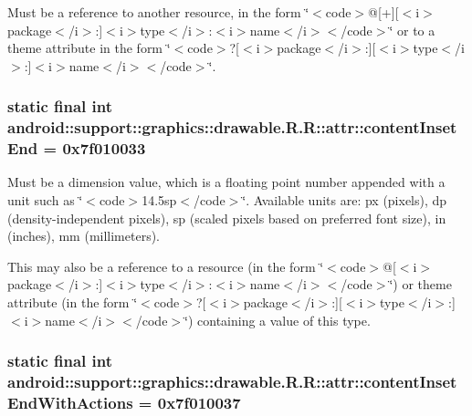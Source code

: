 Must be a reference to another resource, in the form \char`\"{}$<$code$>$@\mbox{[}+\mbox{]}\mbox{[}$<$i$>$package$<$/i$>$:\mbox{]}$<$i$>$type$<$/i$>$:$<$i$>$name$<$/i$>$$<$/code$>$\char`\"{} or to a theme attribute in the form \char`\"{}$<$code$>$?\mbox{[}$<$i$>$package$<$/i$>$:\mbox{]}\mbox{[}$<$i$>$type$<$/i$>$:\mbox{]}$<$i$>$name$<$/i$>$$<$/code$>$\char`\"{}. \hypertarget{classandroid_1_1support_1_1graphics_1_1drawable_1_1_r_1_1attr_b7284e45241ce881c7ae97c4d7c5f2c3}{
\subsubsection[{contentInsetEnd}]{\setlength{\rightskip}{0pt plus 5cm}static final int android::support::graphics::drawable.R.R::attr::contentInsetEnd = 0x7f010033}}
\label{classandroid_1_1support_1_1graphics_1_1drawable_1_1_r_1_1attr_b7284e45241ce881c7ae97c4d7c5f2c3}


Must be a dimension value, which is a floating point number appended with a unit such as \char`\"{}$<$code$>$14.5sp$<$/code$>$\char`\"{}. Available units are: px (pixels), dp (density-independent pixels), sp (scaled pixels based on preferred font size), in (inches), mm (millimeters). 

This may also be a reference to a resource (in the form \char`\"{}$<$code$>$@\mbox{[}$<$i$>$package$<$/i$>$:\mbox{]}$<$i$>$type$<$/i$>$:$<$i$>$name$<$/i$>$$<$/code$>$\char`\"{}) or theme attribute (in the form \char`\"{}$<$code$>$?\mbox{[}$<$i$>$package$<$/i$>$:\mbox{]}\mbox{[}$<$i$>$type$<$/i$>$:\mbox{]}$<$i$>$name$<$/i$>$$<$/code$>$\char`\"{}) containing a value of this type. \hypertarget{classandroid_1_1support_1_1graphics_1_1drawable_1_1_r_1_1attr_a68f41a8a33c3cee1d59c3262c781c09}{
\subsubsection[{contentInsetEndWithActions}]{\setlength{\rightskip}{0pt plus 5cm}static final int android::support::graphics::drawable.R.R::attr::contentInsetEndWithActions = 0x7f010037}}
\label{classandroid_1_1support_1_1graphics_1_1drawable_1_1_r_1_1attr_a68f41a8a33c3cee1d59c3262c781c09}



